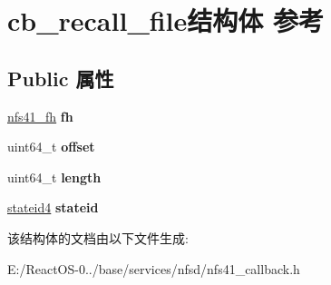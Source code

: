 \hypertarget{structcb__recall__file}{}\section{cb\+\_\+recall\+\_\+file结构体 参考}
\label{structcb__recall__file}
\subsection*{Public 属性}
\begin{DoxyCompactItemize}
\item 
\mbox{\label{structcb__recall__file_a28d04ab1a54dec2b4ef6dc34ed1dfee0}} 
\hyperlink{struct____nfs41__fh}{nfs41\+\_\+fh} {\bfseries fh}
\item 
\mbox{\label{structcb__recall__file_ab7079fe11e2d856df09aea3911c2148e}} 
uint64\+\_\+t {\bfseries offset}
\item 
\mbox{\label{structcb__recall__file_a44ab2471002f260ebaa22f7deeec1d6f}} 
uint64\+\_\+t {\bfseries length}
\item 
\mbox{\label{structcb__recall__file_afdcfebc187c155223b6c95d62cb533e5}} 
\hyperlink{struct____stateid4}{stateid4} {\bfseries stateid}
\end{DoxyCompactItemize}


该结构体的文档由以下文件生成\+:\begin{DoxyCompactItemize}
\item 
E\+:/\+React\+O\+S-\/0../base/services/nfsd/nfs41\+\_\+callback.\+h\end{DoxyCompactItemize}
